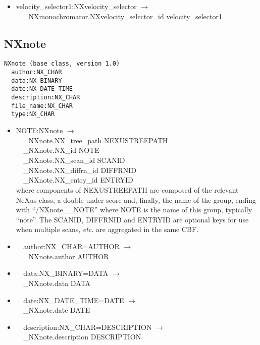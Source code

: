 \documentclass[11pt]{article}
\begin{document}
{{\begin{itemize}
\item{velocity\_selector1:NXvelocity\_selector $\rightarrow$\\
\verb|  |\_NXmonochromator.NXvelocity\_selector\_id velocity\_selector1}
\end{itemize}
\subsection{NXnote}

\begin{verbatim}
NXnote (base class, version 1.0)
  author:NX_CHAR
  data:NX_BINARY
  date:NX_DATE_TIME
  description:NX_CHAR
  file_name:NX_CHAR
  type:NX_CHAR
\end{verbatim}

\begin{itemize}

\item{NOTE:NXnote $\rightarrow$\\
\verb|  |\_NXnote.NX\_tree\_path    NEXUSTREEPATH \\
\verb|  |\_NXnote.NX\_id            NOTE\\
\verb|  |\_NXnote.NX\_scan\_id      SCANID \\
\verb|  |\_NXnote.NX\_diffrn\_id    DIFFRNID \\
\verb|  |\_NXnote.NX\_entry\_id     ENTRYID \\
where components of NEXUSTREEPATH are composed of the
relevant NeXus class, a double under score and, finally, the
name of the group, ending with ``/NXnote\_\_NOTE''
where NOTE is the name of this group, typically ``note''.
The SCANID, DIFFRNID and ENTRYID are optional keys for use
when multiple scans, {\it etc.} are aggregated in the same CBF.}

\item{\verb|  |author:NX\_CHAR=AUTHOR $\rightarrow$\\
\verb|  |\_NXnote.author AUTHOR}

\item{\verb|  |data:NX\_BINARY=DATA $\rightarrow$\\
\verb|  |\_NXnote.data DATA}

\item{\verb|  |date:NX\_DATE\_TIME=DATE $\rightarrow$\\
\verb|  |\_NXnote.date DATE}

\item{\verb|  |description:NX\_CHAR=DESCRIPTION $\rightarrow$\\
\verb|  |\_NXnote.description DESCRIPTION}


\end{itemize}}}
\end{document}
